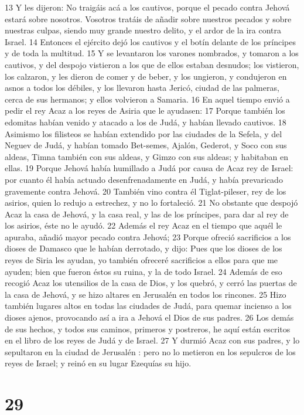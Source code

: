 13 Y les dijeron: No traigáis acá a los cautivos, porque el pecado contra Jehová estará sobre nosotros. Vosotros tratáis de añadir sobre nuestros pecados y sobre nuestras culpas, siendo muy grande nuestro delito, y el ardor de la ira contra Israel.
14 Entonces el ejército dejó los cautivos y el botín delante de los príncipes y de toda la multitud.
15 Y se levantaron los varones nombrados, y tomaron a los cautivos, y del despojo vistieron a los que de ellos estaban desnudos; los vistieron, los calzaron, y les dieron de comer y de beber, y los ungieron, y condujeron en asnos a todos los débiles, y los llevaron hasta Jericó, ciudad de las palmeras, cerca de sus hermanos; y ellos volvieron a Samaria.
16 En aquel tiempo envió a pedir el rey Acaz a los reyes de Asiria que le ayudasen:
17 Porque también los edomitas habían venido y atacado a los de Judá, y habían llevado cautivos.
18 Asimismo los filisteos se habían extendido por las ciudades de la Sefela, y del Neguev de Judá, y habían tomado Bet-semes, Ajalón, Gederot, y Soco con sus aldeas, Timna también con sus aldeas, y Gimzo con sus aldeas; y habitaban en ellas.
19 Porque Jehová había humillado a Judá por causa de Acaz rey de Israel: por cuanto él había actuado desenfrenadamente en Judá, y había prevaricado gravemente contra Jehová.
20 También vino contra él Tiglat-pileser, rey de los asirios, quien lo redujo a estrechez, y no lo fortaleció.
21 No obstante que despojó Acaz la casa de Jehová, y la casa real, y las de los príncipes, para dar al rey de los asirios, éste no le ayudó.
22 Además el rey Acaz en el tiempo que aquél le apuraba, añadió mayor pecado contra Jehová;
23 Porque ofreció sacrificios a los dioses de Damasco que le habían derrotado, y dijo: Pues que los dioses de los reyes de Siria les ayudan, yo también ofreceré sacrificios a ellos para que me ayuden; bien que fueron éstos su ruina, y la de todo Israel. 
24 Además de eso recogió Acaz  los utensilios de la casa de Dios, y los quebró, y cerró las puertas de la casa de Jehová,  y se hizo altares en Jerusalén  en todos los rincones.
25 Hizo también lugares altos en todas las ciudades de Judá, para quemar incienso a los dioses ajenos, provocando así a ira a Jehová el Dios de sus padres.
26 Los demás de sus hechos, y todos sus caminos, primeros y postreros, he aquí están escritos en el libro de los reyes de Judá y de Israel.
27 Y durmió Acaz con sus padres, y lo sepultaron en la ciudad de Jerusalén : pero no lo metieron en los sepulcros de los reyes de Israel; y reinó en su lugar Ezequías su hijo.

\chapter{29}

